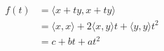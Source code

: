\documentclass[preview]{standalone}
\begin{document}
\begin{align*}
f(t) & = \langle x + ty,x + ty \rangle \\& = \langle x,x \rangle +  2\langle x,y \rangle t + \langle y,y \rangle t^{2} \\&  = c+bt+at^{2}
\end{align*}
\end{document}
